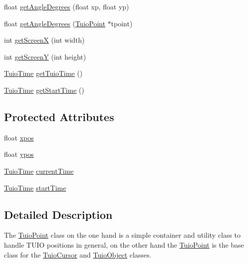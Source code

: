 \begin{DoxyCompactItemize}
float \hyperlink{class_t_u_i_o_1_1_tuio_point_a96316f957c35019a21b0a1e4cc749ed7}{get\+Angle\+Degrees} (float xp, float yp)
\item 
float \hyperlink{class_t_u_i_o_1_1_tuio_point_af1ba5c843255cd17a1c2f4dc38cb519b}{get\+Angle\+Degrees} (\hyperlink{class_t_u_i_o_1_1_tuio_point}{Tuio\+Point} $\ast$tpoint)
\item 
int \hyperlink{class_t_u_i_o_1_1_tuio_point_aad89a76563d49f91412e7795ea7b02d0}{get\+ScreenX} (int width)
\item 
int \hyperlink{class_t_u_i_o_1_1_tuio_point_aa03a2aae797ad03d5ce272b80c4204bd}{get\+ScreenY} (int height)
\item 
\hyperlink{class_t_u_i_o_1_1_tuio_time}{Tuio\+Time} \hyperlink{class_t_u_i_o_1_1_tuio_point_a0ad5b8a78622b5b2a92c8d1bb165cd45}{get\+Tuio\+Time} ()
\item 
\hyperlink{class_t_u_i_o_1_1_tuio_time}{Tuio\+Time} \hyperlink{class_t_u_i_o_1_1_tuio_point_a8fc2e5a2536990cce218c8252b757aa0}{get\+Start\+Time} ()
\end{DoxyCompactItemize}
\subsection*{Protected Attributes}
\begin{DoxyCompactItemize}
\item 
float \hyperlink{class_t_u_i_o_1_1_tuio_point_a0021f8dfddd05f2a17e713a94f5457e6}{xpos}
\item 
float \hyperlink{class_t_u_i_o_1_1_tuio_point_a89a038775a681166168735dbc95c7779}{ypos}
\item 
\hyperlink{class_t_u_i_o_1_1_tuio_time}{Tuio\+Time} \hyperlink{class_t_u_i_o_1_1_tuio_point_ad04658d52ab78e3e0ddc21584ceaa2ff}{current\+Time}
\item 
\hyperlink{class_t_u_i_o_1_1_tuio_time}{Tuio\+Time} \hyperlink{class_t_u_i_o_1_1_tuio_point_ac69cfb9784d5fdc966fba57459d1d8e5}{start\+Time}
\end{DoxyCompactItemize}


\subsection{Detailed Description}
The \hyperlink{class_t_u_i_o_1_1_tuio_point}{Tuio\+Point} class on the one hand is a simple container and utility class to handle T\+U\+IO positions in general, on the other hand the \hyperlink{class_t_u_i_o_1_1_tuio_point}{Tuio\+Point} is the base class for the \hyperlink{class_t_u_i_o_1_1_tuio_cursor}{Tuio\+Cursor} and \hyperlink{class_t_u_i_o_1_1_tuio_object}{Tuio\+Object} classes.

